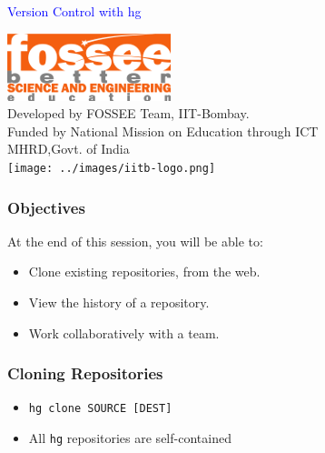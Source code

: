 \documentclass[12pt,compress]{beamer}
\newcommand{\typ}[1]{\lstinline{#1}}
\begin{document}
\begin{frame}

\begin{center}
\vspace{12pt}
\textcolor{blue}{\huge Version Control with hg}
\end{center}
\vspace{18pt}
\begin{center}
\vspace{10pt}
\includegraphics[scale=0.95]{../images/fossee-logo.png}\\
\vspace{5pt}
\scriptsize Developed by FOSSEE Team, IIT-Bombay. \\ 
\scriptsize Funded by National Mission on Education through ICT\\
\scriptsize  MHRD,Govt. of India\\
\texttt{[image: ../images/iitb-logo.png]}\\
\end{center}
\end{frame}

\begin{frame}
  \frametitle{Objectives}
\label{sec-2}

  At the end of this session, you will be able to:
  \begin{itemize}
  \item Clone existing repositories, from the web.
  \item View the history of a repository.
  \item Work collaboratively with a team.
  \end{itemize}
\end{frame}

\begin{frame}[fragile]
  \frametitle{Cloning Repositories}
\label{sec-3}

  \begin{itemize}
  \item \typ{hg clone SOURCE [DEST]}
  \item All \typ{hg} repositories are self-contained
  \end{itemize}
\end{frame}
\end{document}
